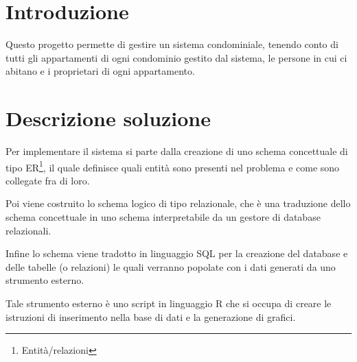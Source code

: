 \section{Introduzione}

Questo progetto permette di gestire un sistema condominiale,
tenendo conto di tutti gli appartamenti di ogni condominio
gestito dal sistema, le persone in cui ci abitano e i
proprietari di ogni appartamento.

\section{Descrizione soluzione}

Per implementare il sistema si parte dalla creazione di uno
schema concettuale di tipo ER\footnote{Entità/relazioni},
il quale definisce quali entità sono presenti nel problema
e come sono collegate fra di loro.

Poi viene costruito lo schema logico di tipo relazionale,
che è una traduzione dello schema concettuale in uno schema
interpretabile da un gestore di database relazionali.

Infine lo schema viene tradotto in linguaggio SQL per la
creazione del database e delle tabelle (o relazioni) le quali
verranno popolate con i dati generati da uno strumento esterno.

Tale strumento esterno è uno script in linguaggio R che si
occupa di creare le istruzioni di inserimento nella base di dati
e la generazione di grafici.
